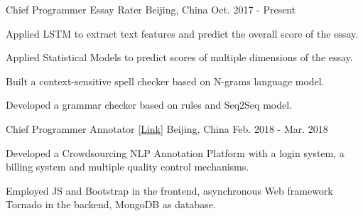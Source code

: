 

\begin{cventries}

  \cventry
    {Chief Programmer} %
    {Essay Rater} %
    {Beijing, China} %
    {Oct. 2017 - Present} %
    {
      \begin{cvitems} %
        \item {Applied LSTM to extract text features and predict the overall score of the essay.}
        \item {Applied Statistical Models to predict scores of multiple dimensions of the essay.}
        \item {Built a context-sensitive spell checker based on N-grams language model.}
        \item {Developed a grammar checker based on rules and Seq2Seq model.}
      \end{cvitems}
    }

  \cventry
    {Chief Programmer} %
    {Annotator \href{http://mark.17zuoye.net/}{[\underline{Link}]}} %
    {Beijing, China} %
    {Feb. 2018 - Mar. 2018} %
    {
      \begin{cvitems} %
        \item {Developed a Crowdsourcing NLP Annotation Platform with a login system, a billing system and multiple quality control mechanisms.}
        \item {Employed JS and Bootstrap in the frontend, asynchronous Web framework Tornado in the backend, MongoDB as database.}
      \end{cvitems}
    }



\end{cventries}

